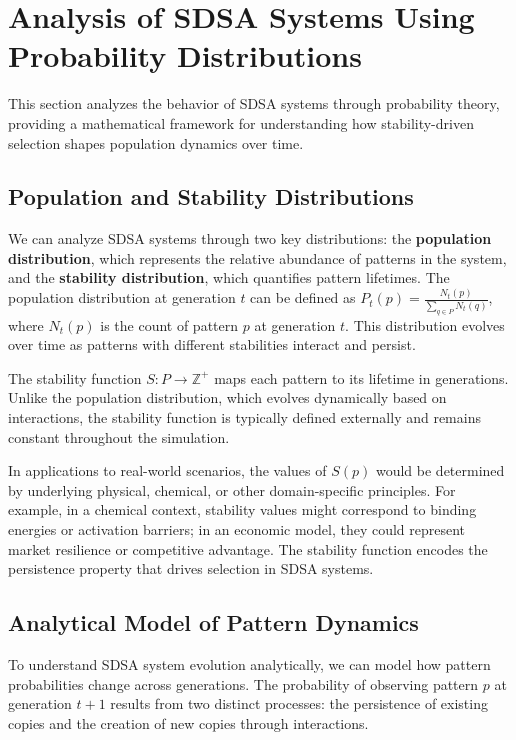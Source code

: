 \documentclass[preprint,12pt]{elsarticle}
\begin{document}
\section{Analysis of SDSA Systems Using Probability Distributions}

This section analyzes the behavior of SDSA systems through probability theory, providing a mathematical framework for understanding how stability-driven selection shapes population dynamics over time.

\subsection{Population and Stability Distributions}

We can analyze SDSA systems through two key distributions: the \textbf{population distribution}, which represents the relative abundance of patterns in the system, and the \textbf{stability distribution}, which quantifies pattern lifetimes. The population distribution at generation \( t \) can be defined as \( P_t(p) = \frac{N_t(p)}{\sum_{q \in P} N_t(q)} \), where \( N_t(p) \) is the count of pattern \( p \) at generation \( t \). This distribution evolves over time as patterns with different stabilities interact and persist.

The stability function \( S: P \rightarrow \mathbb{Z}^{+} \) maps each pattern to its lifetime in generations. Unlike the population distribution, which evolves dynamically based on interactions, the stability function is typically defined externally and remains constant throughout the simulation.

In applications to real-world scenarios, the values of \(S(p)\) would be determined by underlying physical, chemical, or other domain-specific principles. For example, in a chemical context, stability values might correspond to binding energies or activation barriers; in an economic model, they could represent market resilience or competitive advantage. The stability function encodes the persistence property that drives selection in SDSA systems.

\subsection{Analytical Model of Pattern Dynamics}

To understand SDSA system evolution analytically, we can model how pattern probabilities change across generations. The probability of observing pattern \(p\) at generation \(t+1\) results from two distinct processes: the persistence of existing copies and the creation of new copies through interactions.
\end{document}
